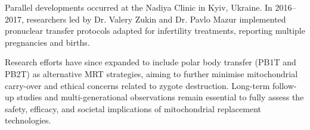 \begin{historical}
Parallel developments occurred at the Nadiya Clinic in Kyiv, Ukraine. In 2016–2017, researchers led by Dr. Valery Zukin and Dr. Pavlo Mazur implemented pronuclear transfer protocols adapted for infertility treatments, reporting multiple pregnancies and births. 

Research efforts have since expanded to include polar body transfer (PB1T and PB2T) as alternative MRT strategies, aiming to further minimise mitochondrial carry-over and ethical concerns related to zygote destruction. Long-term follow-up studies and multi-generational observations remain essential to fully assess the safety, efficacy, and societal implications of mitochondrial replacement technologies.

\end{historical}
